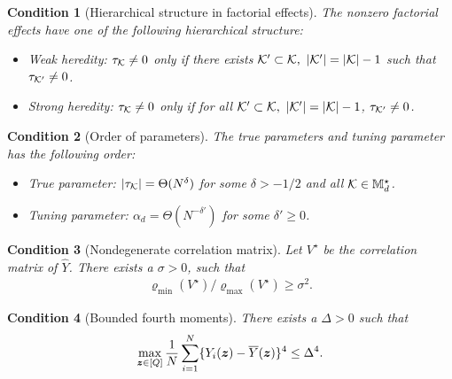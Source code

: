 \documentclass[12pt]{article}
\newtheorem{condition}{Condition}
\begin{document}
\begin{condition}[Hierarchical structure in factorial effects]\label{cond:heredity} The nonzero factorial effects have one of the following hierarchical structure:
\begin{itemize}
\item Weak heredity: $\tau_{\mathcal{K}}\neq 0$ only if there exists ${\mathcal{K}}'\subset{\mathcal{K}},~|{\mathcal{K}}'| = |{\mathcal{K}}| - 1$ such that $\tau_{{\mathcal{K}}'}\neq 0$.

\item Strong heredity: $\tau_{\mathcal{K}}\neq 0$ only if for all ${\mathcal{K}}'\subset{\mathcal{K}},~|{\mathcal{K}}'| = |{\mathcal{K}}| - 1$, $\tau_{{\mathcal{K}}'}\neq 0$.

\end{itemize}

\end{condition}

\begin{condition}[Order of parameters]\label{cond:order}
The true parameters and tuning parameter has the following order:
\begin{itemize}
    \item True parameter: $|\tau_{\mathcal{K}}| =  \Theta(N^\delta)$ for some $\delta > -1/2$ and all ${\mathcal{K}}\in{\mathbb{M}}_d^\star$.
    \item Tuning parameter: ${\alpha_d} =  \Theta(N^{-\delta'})$ for some $\delta'\ge 0$.
\end{itemize} 
\end{condition}

\begin{condition}[Nondegenerate correlation matrix]\label{cond:nondegenerate-corr}
Let $V^\star$ be the correlation matrix of $\hat{Y}$. There exists a $\sigma > 0$, such that 
    \begin{align}\label{eqn:nondegenerate-var}
        \varrho_{\min}(V^\star)/\varrho_{\max}(V^\star) \ge \sigma^2.
    \end{align}
\end{condition}

\begin{condition}[Bounded fourth moments]\label{cond:bounded-moments}
There exists a $ \Delta > 0$ such that
\begin{align}\label{eqn:bounded-moments}
   \max_{{\boldsymbol{z}}\in[Q]}\frac{1}{N}\sum_{i=1}^N \{Y_i({\boldsymbol{z}}) - \overline{Y}({\boldsymbol{z}})\}^4 \le \Delta^4.
\end{align}


\end{condition}
\end{document}
